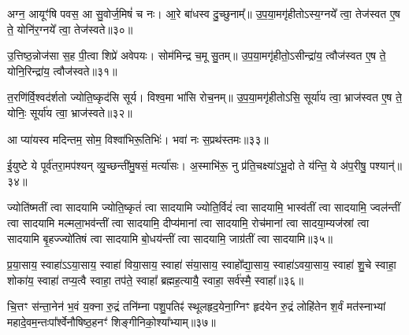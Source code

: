 {\anuvakamend[{हरिः॒ षड्विꣳ॑शतिः॥28॥}]}

अग्न॒ आयूꣳ॑षि पवस॒ आ सु॒वोर्ज॒मिषं॑ च नः। आ॒रे बा॑धस्व दु॒च्छुनाम्᳚॥ उ॒प॒या॒मगृ॑हीतो\-ऽस्य॒ग्नये᳚ त्वा॒ तेज॑स्वत ए॒ष ते॒ योनि॑र॒ग्नये᳚ त्वा॒ तेज॑स्वते॥३०॥

{\anuvakamend[{अग्न॒ आयूꣳ॑षि॒ त्रयो॑वि ꣳशतिः॥29॥}]}

उ॒त्तिष्ठ॒न्नोज॑सा स॒ह पी॒त्वा शिप्रे॑ अवेपयः। सोम॑मिन्द्र च॒मू सु॒तम्॥ उ॒प॒या॒मगृ॑हीतो॒\-ऽसीन्द्रा॑य॒ त्वौज॑स्वत ए॒ष ते॒ योनि॒रिन्द्रा॑य॒ त्वौज॑स्वते॥३१॥

{\anuvakamend[{उ॒त्तिष्ठ॒न्नेक॑विꣳशतिः॥30॥}]}

त॒रणि॑र्वि॒श्वद॑र्\mbox{}शतो ज्योति॒ष्कृद॑सि सूर्य। विश्व॒मा भा॑सि रोच॒नम्॥ उ॒प॒या॒मगृ॑हीतो\-ऽसि॒ सूर्या॑य त्वा॒ भ्राज॑स्वत ए॒ष ते॒ योनिः॒ सूर्या॑य त्वा॒ भ्राज॑स्वते॥३२॥

{\anuvakamend[{त॒रणि॑र्विꣳश॒तिः॥31॥}]}

आ प्या॑यस्व मदिन्तम॒ सोम॒ विश्वा॑भिरू॒तिभिः॑। भवा॑ नः स॒प्रथ॑स्तमः॥३३॥

{\anuvakamend[{आ प्या॑यस्व॒ नव॑॥32॥}]}

ई॒युष्टे ये पूर्व॑तरा॒मप॑श्यन् व्यु॒च्छन्ती॑मु॒षसं॒ मर्त्या॑सः। अ॒स्माभि॑रू॒ नु प्र॑ति॒चक्ष्या॑\-ऽभू॒दो ते य॑न्ति॒ ये अ॑प॒रीषु॒ पश्यान्॑॥३४॥

{\anuvakamend[{ई॒युरेका॒न्नविꣳ॑शतिः॥33॥}]}

ज्योति॑ष्मतीं त्वा सादयामि ज्योति॒ष्कृतं॑ त्वा सादयामि ज्योति॒र्विदं॑ त्वा सादयामि॒ भास्व॑तीं त्वा सादयामि॒ ज्वल॑न्तीं त्वा सादयामि मल्मला॒भव॑न्तीं त्वा सादयामि॒ दीप्य॑मानां त्वा सादयामि॒ रोच॑मानां त्वा सादया॒म्यज॑स्रां त्वा सादयामि बृ॒हज्ज्यो॑तिषं त्वा सादयामि बो॒धय॑न्तीं त्वा सादयामि॒ जाग्र॑तीं त्वा सादयामि॥३५॥

{\anuvakamend[{ज्योति॑ष्मती॒ꣳ॒ षट्त्रिꣳ॑शत्॥34॥}]}

प्र॒या॒साय॒ स्वाहा॑\-ऽ\-ऽया॒साय॒ स्वाहा॑ विया॒साय॒ स्वाहा॑ संया॒साय॒ स्वाहो᳚द्या॒साय॒ स्वाहा॑\-ऽवया॒साय॒ स्वाहा॑ शु॒चे स्वाहा॒ शोका॑य॒ स्वाहा॑ तप्य॒त्वै स्वाहा॒ तप॑ते॒ स्वाहा᳚ ब्रह्मह॒त्यायै॒ स्वाहा॒ सर्व॑स्मै॒ स्वाहा᳚॥३६॥

{\anuvakamend[{प्र॒या॒साय॒ चतु॑र्विꣳशतिः॥35॥}]}

चि॒त्तꣳ स॑न्ता॒नेन॑ भ॒वं य॒क्ना रु॒द्रं तनि॑म्ना पशु॒पतिꣴ॑ स्थूलहृद॒येना॒ग्निꣳ हृद॑येन रु॒द्रं लोहि॑तेन श॒र्वं मत॑स्नाभ्यां महादे॒वम॒न्तःपा᳚र्श्वेनौषिष्ठ॒हनꣳ॑ शिङ्गीनिको॒श्या᳚भ्याम्॥३७॥

{\anuvakamend[{चि॒त्तम॒ष्टाद॑श॥36॥}]}

